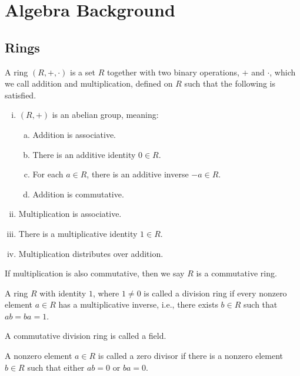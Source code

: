\section{Algebra Background}

\subsection{Rings}
\begin{defn}
  A ring $(R, +, \cdot)$ is a set $R$ together with two binary operations, $+$
  and $\cdot$, which we call addition and multiplication, defined on $R$ such
  that the following is satisfied.
  
  \begin{enumerate}[(i)]
    \item $(R,+)$ is an abelian group, meaning:
    \begin{enumerate}[(a)]
      \item Addition is associative.
      \item There is an additive identity $0 \in R$.
      \item For each $a \in R$, there is an additive inverse $-a \in R$.
      \item Addition is commutative.
    \end{enumerate}
    
    \item Multiplication is associative. 
    \item There is a multiplicative identity $1 \in R$.
    \item Multiplication distributes over addition.
  \end{enumerate}
  
  If multiplication is also commutative, then we say $R$ is a commutative ring.
\end{defn}


\begin{defn}
  A ring $R$ with identity $1$, where $1 \neq 0$ is called a division ring
  if every nonzero element $a \in R$ has a multiplicative inverse, i.e., there
  exists $b \in R$ such that $ab=ba=1$.
  
  A commutative division ring is called a field. 
\end{defn}


\begin{defn}
  A nonzero element $a \in R$ is called a zero divisor if there is a nonzero
  element $b \in R$ such that either $ab=0$ or $ba=0$.
\end{defn}


